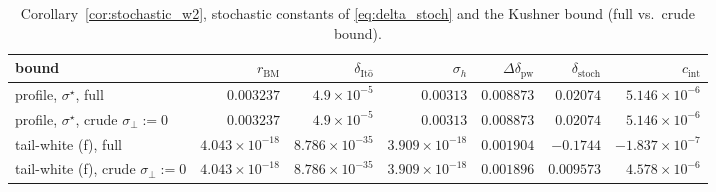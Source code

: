 \begin{table}[t]
\centering
\caption{Corollary~\ref{cor:stochastic_w2}, stochastic constants of \eqref{eq:delta_stoch} and the Kushner bound (full vs.\ crude bound).}
\label{tab:exp7_corollary_stoch}
\footnotesize
\setlength{\tabcolsep}{4pt}
\begin{tabular}{lrrrrrr}
\toprule
bound & $r_{\mathrm{BM}}$ & $\delta_{\mathrm{It\hat o}}$ & $\sigma_h$ & $\Delta\delta_{\mathrm{pw}}$ & $\delta_{\mathrm{stoch}}$ & $c_{\mathrm{int}}$ \\
\midrule
profile, $\sigma^\star$, full & $0.003237$ & $4.9\times10^{-5}$ & $0.00313$ & $0.008873$ & $0.02074$ & $5.146\times10^{-6}$ \\
profile, $\sigma^\star$, crude $\sigma_\perp:=0$ & $0.003237$ & $4.9\times10^{-5}$ & $0.00313$ & $0.008873$ & $0.02074$ & $5.146\times10^{-6}$ \\
tail-white (f), full & $4.043\times10^{-18}$ & $8.786\times10^{-35}$ & $3.909\times10^{-18}$ & $0.001904$ & $-0.1744$ & $-1.837\times10^{-7}$ \\
tail-white (f), crude $\sigma_\perp:=0$ & $4.043\times10^{-18}$ & $8.786\times10^{-35}$ & $3.909\times10^{-18}$ & $0.001896$ & $0.009573$ & $4.578\times10^{-6}$ \\
\bottomrule
\end{tabular}
\end{table}
